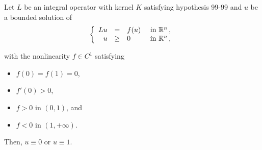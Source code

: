 \begin{theorem}
\label{Thm: SymmetryWholeSpace}
Let $L$ be an integral operator with kernel $K$ satisfying hypothesis 99-99 and $u$ be a bounded solution of
\begin{equation}
\label{eq: PositiveWholeSpace}
\left\{\begin{array}{rcll}
L u &=& f(u) & \textrm{ in }\mathbb{R}^n\,,\\
u &\geq& 0 & \textrm{ in } \mathbb{R}^n\,,
\end{array} \right.
\end{equation}


with the nonlinearity $f\in C^1$ satisfying
\begin{itemize}
\item $f(0) = f(1) = 0$,
\item $f'(0)>0$,
\item $f>0$ in $(0,1)$, and
\item $f<0$ in $(1,+\infty)$.
\end{itemize}
Then, $u\equiv 0$ or $u \equiv 1$.
\end{theorem}


